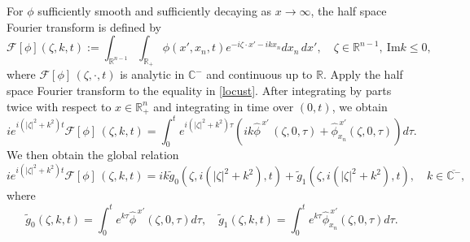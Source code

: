 \documentclass[preprint,compress,12pt]{elsarticle}
\numberwithin{equation}{section}
\begin{document}
For $\phi$ sufficiently smooth and sufficiently decaying as $x\rightarrow\infty$, the half space Fourier transform is defined by
\begin{equation}\label{torture}
	\mathscr{F}[\phi](\zeta,k,t):= \int_{\mathbb{R}^{n-1}}\int_{\mathbb{R}_{+}} \phi(x',x_{n},t) e^{-i\zeta\cdot x'-ik x_{n}} dx_{n}\,dx',\quad \zeta\in\mathbb{R}^{n-1},\ \text{Im} k\leq 0,
\end{equation}
where	$\mathscr{F}[\phi]\,(\zeta,\cdot,t)$ is analytic in $\mathbb{C}^{-}$ and continuous up to  $\mathbb{R}$.  Apply the half space Fourier transform to the equality in \eqref{locust}. After integrating by parts twice with respect to $x\in\mathbb{R}_{+}^{n}$ and integrating in time over $(0,t)$, we obtain
\begin{equation*} ie^{i(|\zeta|^{2}+k^{2})t}\mathscr{F}[\phi]\,(\zeta,k,t)=\int_{0}^{t}e^{i(|\zeta|^{2}+k^{2})\tau} \left(ik\widehat{\phi}^{\,x'}\,(\zeta,0,\tau) +\widehat{\phi}^{\,x'}_{x_{n}}(\zeta,0,\tau) \right) d\tau.
\end{equation*}
We then obtain the global relation
\begin{equation}\label{hawker}
	ie^{i(|\zeta|^{2}+k^{2})t}\mathscr{F}[\phi]\,(\zeta,k,t)=ik \widetilde{g}_{0}\left(\zeta,i(|\zeta|^{2}+k^{2}),t\right)+\widetilde{g}_{1}\left(\zeta,i(|\zeta|^{2}+k^{2}),t\right),\quad k\in\overline{\mathbb{C}^{-}},
\end{equation}
where\begin{equation}\label{251}
	\widetilde{g}_{0}(\zeta,k,t)=\int_{0}^{t} e^{k\tau} \widehat{\phi}^{\,x'}(\zeta,0,\tau)d\tau,\quad\widetilde{g}_{1}(\zeta,k,t)=\int_{0}^{t} e^{k\tau} \widehat{\phi}^{\,x'}_{x_{n}}(\zeta,0,\tau)d\tau.
\end{equation}
\end{document}
